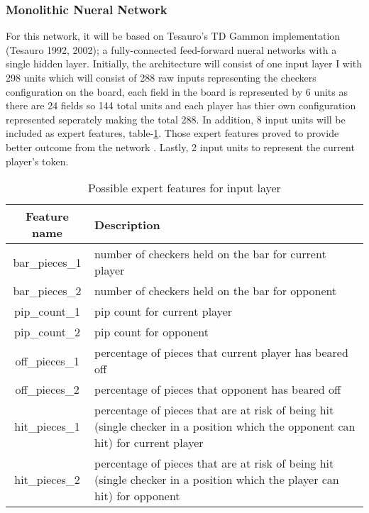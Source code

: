 \documentclass[12pt,a4paper]{article}
\begin{document}
\subsubsection{Monolithic Nueral Network}
For this network, it will be based on Tesauro's TD Gammon implementation (Tesauro 1992, 2002); a fully-connected feed-forward nueral networks with a single hidden layer. Initially, the architecture will consist of one input layer I with 298 units which will consist of 288 raw inputs representing the checkers configuration on the board, each field in the board is represented by 6 units as there are 24 fields so 144 total units and each player has thier own configuration represented seperately making the total 288. In addition, 8 input units will be included as expert features, table-\ref{exfeat}. Those expert features proved to provide better outcome from the network \cite{}. Lastly, 2 input units to represent the current player's token. 
\begin{table}[htb]
    \centering
    \caption{Possible expert features for input layer}
    \vspace*{6pt}
    \label{exfeat}
    \begin{tabular}{cp{12cm}}
        \hline
        \hline
        Feature name & Description \\ 
        \hline
        bar\_pieces\_1 & number of checkers held on the bar for current player\\
        \hline
        bar\_pieces\_2 & number of checkers held on the bar for opponent\\
        \hline
        pip\_count\_1 & pip count for current player \\
        \hline
        pip\_count\_2 & pip count for opponent \\
        \hline
        off\_pieces\_1 & percentage of pieces that current player has beared off \\
        \hline
        off\_pieces\_2 & percentage of pieces that opponent has beared off \\
        \hline
        hit\_pieces\_1 & percentage of pieces that are at risk of being hit (single checker in a position which the opponent can hit) for current player \\
        \hline
        hit\_pieces\_2 & percentage of pieces that are at risk of being hit (single checker in a position which the player can hit) for opponent\\
        \hline
    \end{tabular}
\end{table}
\end{document}
